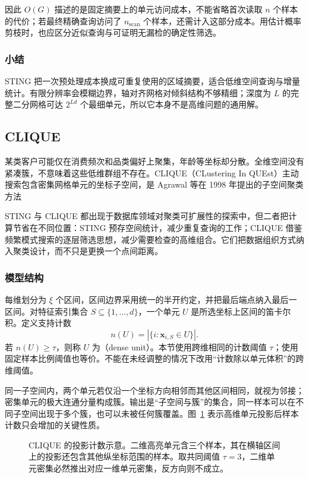 因此 $O(G)$ 描述的是固定摘要上的单元访问成本，不能省略首次读取 $n$ 个样本的代价；若最终精确查询访问了 $n_{\mathrm{scan}}$ 个样本，还需计入这部分成本。用估计概率剪枝时，也应区分近似查询与可证明无漏检的确定性筛选。

\subsubsection{小结}

STING 把一次预处理成本换成可重复使用的区域摘要，适合低维空间查询与增量统计。有限分辨率会模糊边界，轴对齐网格对倾斜结构不够精细；深度为 $L$ 的完整二分网格可达 $2^{Ld}$ 个最细单元，所以它本身不是高维问题的通用解。

\subsection{CLIQUE}
\label{sec:clustering-clique}

某类客户可能仅在消费频次和品类偏好上聚集，年龄等坐标却分散。全维空间没有紧凑簇，不意味着这些低维群组不存在。CLIQUE（CLustering In QUEst）主动搜索包含密集网格单元的坐标子空间，是 Agrawal 等在 1998 年提出的子空间聚类方法

STING 与 CLIQUE 都出现于数据库领域对聚类可扩展性的探索中，但二者把计算节省在不同位置：STING 预存空间统计，减少重复查询的工作；CLIQUE 借鉴频繁模式搜索的逐层筛选思想，减少需要检查的高维组合。它们把数据组织方式纳入聚类设计，而不只是更换一个点间距离。

\subsubsection{模型结构}

每维划分为 $\xi$ 个区间，区间边界采用统一的半开约定，并把最后端点纳入最后一区间。对特征索引集合 $S\subseteq\{1,\ldots,d\}$，一个单元 $U$ 是所选坐标上区间的笛卡尔积。定义支持计数
\[
 n(U)=|\{i:\bm{x}_{i,S}\in U\}|.
\]
若 $n(U)\geq\tau$，则称 $U$ 为（dense unit）。本节使用跨维相同的计数阈值 $\tau$；使用固定样本比例阈值也等价。不能在未经调整的情况下改用“计数除以单元体积”的跨维阈值。

同一子空间内，两个单元若仅沿一个坐标方向相邻而其他区间相同，就视为邻接；密集单元的极大连通分量构成簇。输出是“子空间与簇”的集合，同一样本可以在不同子空间出现于多个簇，也可以未被任何簇覆盖。图~\ref{fig:clustering-subspace} 表示高维单元投影后样本计数只会增加的关键性质。

\begin{figure}[htbp]
 \centering
 
 \caption{CLIQUE 的投影计数示意。二维高亮单元含三个样本，其在横轴区间上的投影还包含其他纵坐标范围的样本。取共同阈值 $\tau=3$，二维单元密集必然推出对应一维单元密集，反方向则不成立。}
 \label{fig:clustering-subspace}
\end{figure}

